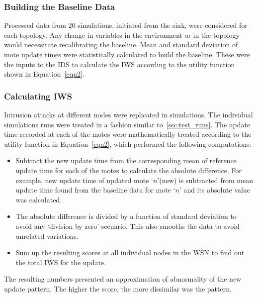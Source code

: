 \documentclass[conference,manuscript]{IEEEtran}
\begin{document}

\subsubsection*{Building the Baseline Data}
\label{ssc:build_baseline}
Processed data from 20 simulations, initiated from the sink, were considered for each topology.
Any change in variables in the environment or in the topology would necessitate recalibrating the baseline.
Mean and standard deviation of mote update times were statistically calculated to build the baseline.
These were the inputs to the IDS to calculate the IWS according to the utility function shown in Equation~\ref{eqn2}. 

\subsubsection*{Calculating IWS}
\label{ssc:calc_iws}

Intrusion attacks at different nodes were replicated in simulations.
The individual simulations runs were treated in a fashion  similar to~\ref{ssc:test_runs}.
The update time recorded at each of the motes were mathematically treated according to the utility function in Equation~\ref{eqn2}, which performed the following computations:
\begin{itemize}
\item Subtract the new update time from the corresponding mean of reference update time for each of the motes to calculate the absolute difference. For example, new update time of updated mote `$n$'(new) is subtracted from mean update time found from the baseline data for mote `$n$' and its absolute value was calculated.
\item The absolute difference is divided by a function of standard deviation to avoid any `division by zero' scenario. This also smooths the data to avoid unrelated variations.
\item Sum up the resulting scores at all individual nodes in the WSN to find out the total IWS for the update.
\end{itemize}
The resulting numbers  presented an approximation of abnormality of the new update pattern. The higher the score, the more dissimilar was the pattern. 
\end{document}
